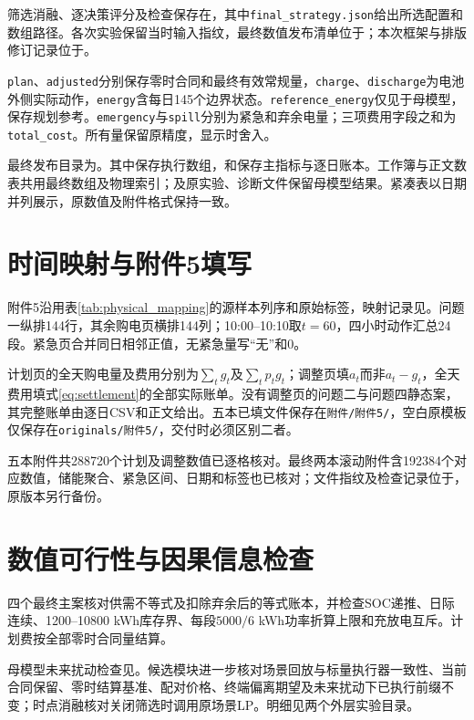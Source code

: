 筛选消融、逐决策评分及检查保存在，其中\texttt{final\_strategy.json}给出所选配置和数组路径。各次实验保留当时输入指纹，最终数值发布清单位于；本次框架与排版修订记录位于。

\texttt{plan}、\texttt{adjusted}分别保存零时合同和最终有效常规量，\texttt{charge}、\texttt{discharge}为电池外侧实际动作，\texttt{energy}含每日145个边界状态。\texttt{reference\_energy}仅见于母模型，保存规划参考。\texttt{emergency}与\texttt{spill}分别为紧急和弃余电量；三项费用字段之和为\texttt{total\_cost}。所有量保留原精度，显示时舍入。

最终发布目录为。其中保存执行数组，和保存主指标与逐日账本。工作簿与正文数表共用最终数组及物理索引；及原实验、诊断文件保留母模型结果。紧凑表以日期并列展示，原数值及附件格式保持一致。

\section{时间映射与附件5填写}

附件5沿用表\ref{tab:physical_mapping}的源样本列序和原始标签，映射记录见。问题一纵排144行，其余购电页横排144列；10:00--10:10取$t=60$，四小时动作汇总24段。紧急页合并同日相邻正值，无紧急量写“无”和0。

计划页的全天购电量及费用分别为$\sum_tg_t$及$\sum_tp_tg_t$；调整页填$a_t$而非$a_t-g_t$，全天费用填式\eqref{eq:settlement}的全部实际账单。没有调整页的问题二与问题四静态案，其完整账单由逐日CSV和正文给出。五本已填文件保存在\texttt{附件/附件5/}，空白原模板仅保存在\texttt{originals/附件5/}，交付时必须区别二者。

五本附件共288720个计划及调整数值已逐格核对。最终两本滚动附件含192384个对应数值，储能聚合、紧急区间、日期和标签也已核对；文件指纹及检查记录位于，原版本另行备份。

\section{数值可行性与因果信息检查}

四个最终主案核对供需不等式及扣除弃余后的等式账本，并检查SOC递推、日际连续、1200--10800 kWh库存界、每段$5000/6$ kWh功率折算上限和充放电互斥。计划费按全部零时合同量结算。

母模型未来扰动检查见。候选模块进一步核对场景回放与标量执行器一致性、当前合同保留、零时结算基准、配对价格、终端偏离期望及未来扰动下已执行前缀不变；时点消融核对关闭筛选时调用原场景LP。明细见两个外层实验目录。

